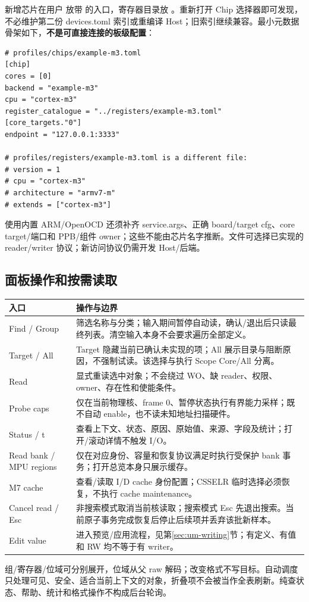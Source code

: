 \documentclass[UTF8,a4paper,11pt,oneside,fontset=none]{ctexart}
\newcommand{\code}[1]{\texttt{\detokenize{#1}}}
\begin{document}
新增芯片在用户  放带 \code{[chip]} 的入口，寄存器目录放 。重新打开 Chip 选择器即可发现，不必维护第二份 devices.toml 索引或重编译 Host；旧索引继续兼容。最小元数据骨架如下，\textbf{不是可直接连接的板级配置}：
\begin{lstlisting}
# profiles/chips/example-m3.toml
[chip]
cores = [0]
backend = "example-m3"
cpu = "cortex-m3"
register_catalogue = "../registers/example-m3.toml"
[core_targets."0"]
endpoint = "127.0.0.1:3333"

# profiles/registers/example-m3.toml is a different file:
# version = 1
# cpu = "cortex-m3"
# architecture = "armv7-m"
# extends = ["cortex-m3"]
\end{lstlisting}
使用内置 ARM/OpenOCD 还须补齐 service.args、正确 board/target cfg、core target/端口和 PPB/组件 owner；这些不能由芯片名字推断。文件可选择已实现的 reader/writer 协议；新访问协议仍需开发 Host/后端。

\subsection{面板操作和按需读取}
\begin{longtable}{@{}P{35mm}P{126mm}@{}}
\toprule 入口 & 操作与边界\\\midrule\endhead
Find / Group & 筛选名称与分类；输入期间暂停自动读，确认/退出后只读最终列表。清空输入本身不会要求遍历全部定义。\\
Target / All & Target 隐藏当前已确认未实现的项；All 展示目录与阻断原因，不强制试读。该选择与执行 Scope Core/All 分离。\\
Read & 显式重读选中对象；不会绕过 WO、缺 reader、权限、owner、存在性和使能条件。\\
Probe caps & 仅在当前物理核、frame 0、暂停状态执行有界能力采样；既不自动 enable，也不读未知地址扫描硬件。\\
Status / t & 查看上下文、状态、原因、原始值、来源、字段及统计；打开/滚动详情不触发 I/O。\\
Read bank / MPU regions & 仅在对应身份、容量和恢复协议满足时执行受保护 bank 事务；打开总览本身只展示缓存。\\
M7 cache & 查看/读取 I/D cache 身份配置；CSSELR 临时选择必须恢复，不执行 cache maintenance。\\
Cancel read / Esc & 非搜索模式取消当前核读取；搜索模式 Esc 先退出搜索。当前原子事务完成恢复后停止后续项并丢弃该批新样本。\\
Edit value & 进入预览/应用流程，见第\ref{sec:um-writing}节；有定义、有值和 RW 均不等于有 writer。\\\bottomrule
\end{longtable}
组/寄存器/位域可分别展开，位域从父 raw 解码；改变格式不写目标。自动调度只处理可见、安全、适合当前上下文的对象，折叠项不会被当作全表刷新。纯查状态、帮助、统计和格式操作不构成后台轮询。
\end{document}
